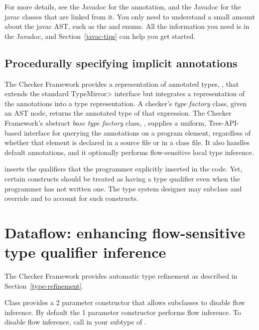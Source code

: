 For more details, see the Javadoc for the 
  annotation, and the Javadoc for the javac classes that are linked from
it.  You only need to understand a small amount about the javac AST, such
as the
\href{\TreeAPIBase{}/tree/Tree.Kind.html?is-external=true}{}
and
enums.  All the information you need is in the Javadoc, and
Section~\ref{javac-tips} can help you get started.


\subsection{Procedurally specifying implicit annotations\label{procedurally-specifying-implicit-annotations}}


The Checker Framework provides a representation of annotated types,
, that extends the standard \<TypeMirror>
interface but integrates a representation of the annotations into a
type representation.  A checker's \emph{type factory} class, given an AST
node, returns the annotated type of that expression.  The Checker
Framework's abstract
\emph{base type factory} class, ,
supplies a uniform, Tree-API-based interface
for querying the annotations on a program element, regardless of
whether that element is declared in a source file or in a class file.
It also handles default annotations, and it optionally performs
flow-sensitive local type inference.

 inserts the qualifiers that the programmer
explicitly inserted in the code.  Yet, certain constructs should be
treated as having a type qualifier even when the programmer has not
written one.  The type system designer may subclass
 and override
 and
 to account for
such constructs.


\section{Dataflow: enhancing flow-sensitive type qualifier inference\label{dataflow}}

The Checker Framework provides automatic type refinement as described
in Section~\ref{type-refinement}.

Class
provides a 2 parameter constructor that allows subclasses to disable
flow inference.
By default the 1 parameter constructor performs flow inference.
To disable flow inference, call
in your subtype of
.

